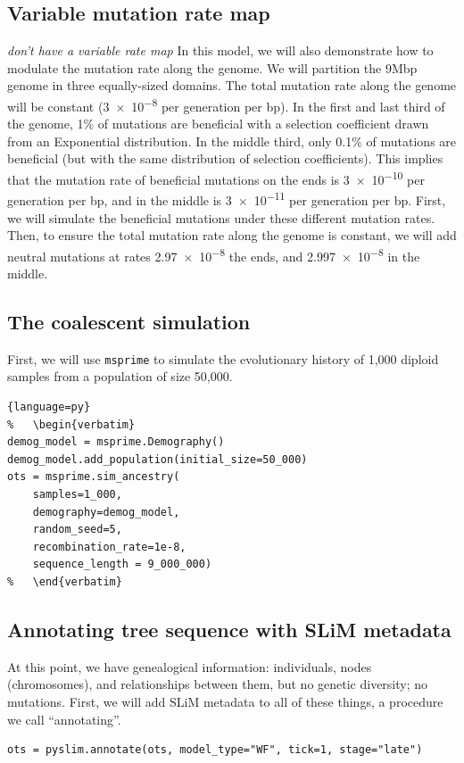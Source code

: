 \documentclass[12pt]{article}
\newcommand{\msprime}[0]{\texttt{msprime}\xspace}
\newcommand{\comment}[1]{\textit{\color{green} #1}}
\begin{document}
\subsection*{Variable mutation rate map}

\comment{don't have a variable rate map}
In this model, we will also demonstrate how to modulate the mutation rate along the genome.
We will partition the 9Mbp genome in three equally-sized domains.
The total mutation rate along the genome will be constant (\num{3e-8} per generation per bp).
In the first and last third of the genome, 1\% of mutations are beneficial with a selection coefficient drawn from an Exponential distribution.
In the middle third, only 0.1\% of mutations are beneficial (but with the same distribution of selection coefficients).
This implies that the mutation rate of beneficial mutations on the ends is \num{3e-10} per generation per bp, and in the middle is \num{3e-11} per generation per bp.
First, we will simulate the beneficial mutations under these different mutation rates.
Then, to ensure the total mutation rate along the genome is constant, we will add neutral mutations at rates \num{2.97e-8} the ends, and \num{2.997e-8} in the middle.


 \subsection*{The coalescent simulation}

 First, we will use \msprime to simulate the evolutionary history of 1,000 diploid samples from a population of size 50,000.

\begin{lstlisting}{language=py}
%   \begin{verbatim}
demog_model = msprime.Demography()
demog_model.add_population(initial_size=50_000)
ots = msprime.sim_ancestry(
    samples=1_000,
    demography=demog_model,
    random_seed=5,
    recombination_rate=1e-8,
    sequence_length = 9_000_000)
%   \end{verbatim}
\end{lstlisting}

\subsection*{Annotating tree sequence with SLiM metadata}

At this point, we have genealogical information: individuals, nodes (chromosomes), and relationships between them,
but no genetic diversity; no mutations. 
First, we will add SLiM metadata to all of these things, a procedure we call “annotating”.
\begin{listing}[H]
  \begin{verbatim}
ots = pyslim.annotate(ots, model_type="WF", tick=1, stage="late")
  \end{verbatim}
\end{listing}
\end{document}
